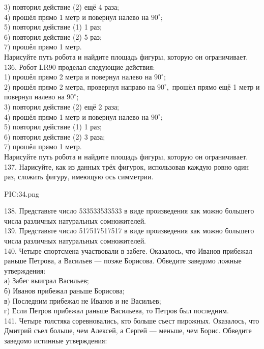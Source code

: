 3) повторил действие (2) ещё 4 раза;\\
4) прошёл прямо 1 метр и повернул налево на $90^\circ$;\\
5) повторил действие (1) 1 раз;\\
6) повторил действие (2) 5 раз;\\
7) прошёл прямо 1 метр.\\
Нарисуйте путь робота и найдите площадь фигуры, которую он ограничивает.\\
136. Робот LR90 проделал следующие действия:\\
1) прошёл прямо 2 метра и повернул налево на $90^\circ$;\\
2) прошёл прямо 2 метра, провернул направо на $90^\circ,$ прошёл прямо ещё 1 метр и повернул налево на $90^\circ$;\\
3) повторил действие (2) ещё 2 раза;\\
4) прошёл прямо 1 метр и повернул налево на $90^\circ$;\\
5) повторил действие (1) 1 раз;\\
6) повторил действие (2) 3 раза;\\
7) прошёл прямо 1 метр.\\
Нарисуйте путь робота и найдите площадь фигуры, которую он ограничивает.\\
137. Нарисуйте, как из данных трёх фигурок, использовав каждую ровно один раз, сложить фигуру, имеющую ось симметрии.
\begin{center}
{{PIC:34.png}}
\end{center}
138. Представьте число 533533533533 в виде произведения как можно большего числа различных натуральных сомножителей.\\
139. Представьте число 517517517517 в виде произведения как можно большего числа различных натуральных сомножителей.\\
140. Четыре спортсмена участвовали в забеге. Оказалось, что Иванов прибежал раньше Петрова, а Васильев --- позже Борисова. Обведите заведомо ложные утверждения:\\
а) Забег выиграл Васильев;\\
б) Иванов прибежал раньше Борисова;\\
в) Последним прибежал не Иванов и не Васильев;\\
г) Если Петров прибежал раньше Васильева, то Петров был последним.\\
141. Четыре толстяка соревновались, кто больше съест пирожных. Оказалось, что Дмитрий съел больше, чем Алексей, а Сергей --- меньше, чем Борис. Обведите заведомо истинные утверждения:\\
